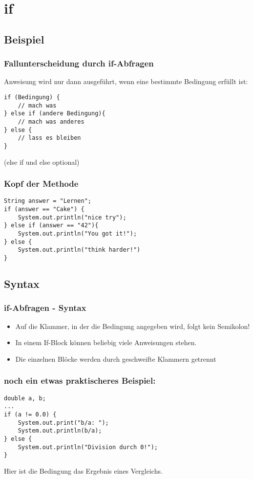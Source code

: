 \documentclass[final]{beamer}
\begin{document}
\section{if}
\subsection{Beispiel}
\begin{frame}[containsverbatim]
	\frametitle{Fallunterscheidung durch if-Abfragen}
	Anweisung wird nur dann ausgeführt, wenn eine bestimmte Bedingung erfüllt ist:
	\begin{lstlisting}
if (Bedingung) {
	// mach was
} else if (andere Bedingung){
	// mach was anderes
} else {
	// lass es bleiben
}
	\end{lstlisting}
	(else if und else optional)
\end{frame}

\begin{frame}[containsverbatim]
	\frametitle{Kopf der Methode}
	\begin{lstlisting}
String answer = "Lernen";
if (answer == "Cake") {
	System.out.println("nice try");
} else if (answer == "42"){
	System.out.println("You got it!");
} else {
	System.out.println("think harder!")
}
	\end{lstlisting}
\end{frame}

\subsection{Syntax}
\begin{frame}
	\frametitle{if-Abfragen - Syntax}
	\begin{itemize}
		\item{Auf die Klammer, in der die Bedingung angegeben wird, folgt kein Semikolon!}
		\item{In einem If-Block können beliebig viele Anweisungen stehen.}
		\item{Die einzelnen Blöcke werden durch geschweifte Klammern getrennt}
	\end{itemize}
\end{frame}

\begin{frame}[containsverbatim]
	\frametitle{noch ein etwas praktischeres Beispiel:}
	\begin{lstlisting}
double a, b;
...
if (a != 0.0) {
	System.out.print("b/a: ");
	System.out.println(b/a);
} else {
	System.out.println("Division durch 0!");
}
	\end{lstlisting}	
	Hier ist die Bedingung das Ergebnis eines Vergleichs.	
\end{frame}
\end{document}
